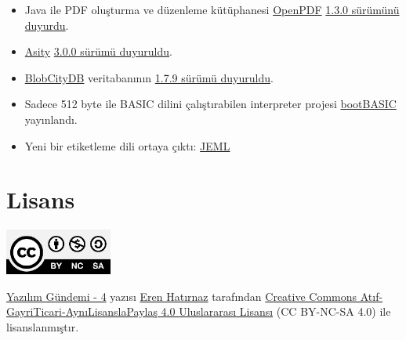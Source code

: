 \documentclass[11pt]{article}
\begin{document}
\begin{itemize}
{yayınladı}.
\item Java ile PDF oluşturma ve düzenleme kütüphanesi \href{https://github.com/LibrePDF/OpenPDF}{OpenPDF} \href{https://github.com/LibrePDF/OpenPDF/releases/tag/1.3.0}{1.3.0 sürümünü
duyurdu}.
\item \href{https://github.com/cettia/asity}{Asity} \href{https://cettia.io/blog/asity-3-0-0-released/}{3.0.0 sürümü duyuruldu}.
\item \href{https://github.com/blobcity/db/}{BlobCityDB} veritabanının \href{https://github.com/blobcity/db/releases}{1.7.9 sürümü duyuruldu}.
\item Sadece 512 byte ile BASIC dilini çalıştırabilen interpreter projesi
\href{https://github.com/nanochess/bootBASIC}{bootBASIC} yayınlandı.
\item Yeni bir etiketleme dili ortaya çıktı: \href{https://github.com/jeml-lang/jeml}{JEML}
\end{itemize}
\section{Lisans}
\label{sec:orgdfece51}
\begin{center}
\begin{center}
\includegraphics[height=1.5cm]{../../../img/CC_BY-NC-SA_4.0.png}
\end{center}

\href{yazilim-gundemi-04.pdf}{Yazılım Gündemi - 4} yazısı \href{https://erenhatirnaz.github.io}{Eren Hatırnaz} tarafından \href{http://creativecommons.org/licenses/by-nc-sa/4.0/}{Creative Commons
Atıf-GayriTicari-AynıLisanslaPaylaş 4.0 Uluslararası Lisansı} (CC BY-NC-SA 4.0)
ile lisanslanmıştır.
\end{center}
\end{document}
